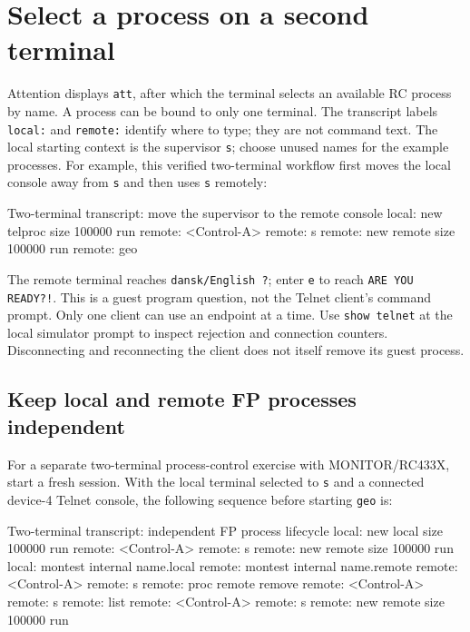 \section{Select a process on a second terminal}\label{select-a-process-on-a-second-terminal}

Attention displays \passthrough{\lstinline!att!}, after which the terminal selects an available RC process by name. A process can be bound to only one terminal. The transcript labels \passthrough{\lstinline!local:!} and \passthrough{\lstinline!remote:!} identify where to type; they are not command text. The local starting context is the supervisor \passthrough{\lstinline!s!}; choose unused names for the example processes. For example, this verified two-terminal workflow first moves the local console away from \passthrough{\lstinline!s!} and then uses \passthrough{\lstinline!s!} remotely:

\begin{commandexample}{Two-terminal transcript: move the supervisor to the remote console}
local:  new telproc size 100000 run
remote: <Control-A>
remote: s
remote: new remote size 100000 run
remote: geo
\end{commandexample}

The remote terminal reaches \texttt{dansk/English ?}; enter \texttt{e} to
reach \texttt{ARE YOU READY?!}. This is a guest program question, not the
Telnet client's command prompt. Only one client can use an endpoint at a time.
Use \texttt{show telnet} at the local simulator prompt to inspect rejection
and connection counters. Disconnecting and reconnecting the client does not
itself remove its guest process.

\subsection{Keep local and remote FP processes independent}\label{keep-local-and-remote-fp-processes-independent}

For a separate two-terminal process-control exercise with MONITOR/RC433X,
start a fresh session. With the local terminal selected to \passthrough{\lstinline!s!} and a connected device-4 Telnet console, the following sequence before starting \passthrough{\lstinline!geo!} is:

\begin{commandexample}{Two-terminal transcript: independent FP process lifecycle}
local:  new local size 100000 run
remote: <Control-A>
remote: s
remote: new remote size 100000 run
local:  montest internal name.local
remote: montest internal name.remote
remote: <Control-A>
remote: s
remote: proc remote remove
remote: <Control-A>
remote: s
remote: list
remote: <Control-A>
remote: s
remote: new remote size 100000 run
\end{commandexample}

